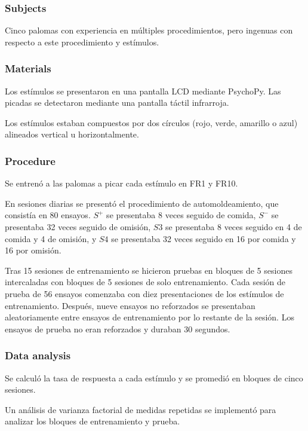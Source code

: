 \documentclass[a4paper,12pt]{article}
\begin{document}
\subsubsection{Subjects}

Cinco palomas con experiencia en múltiples procedimientos, pero ingenuas con respecto a este procedimiento y estímulos.

\subsubsection{Materials}

Los estímulos se presentaron en una pantalla LCD mediante PsychoPy.
Las picadas se detectaron mediante una pantalla táctil infrarroja.

Los estímulos estaban compuestos por dos círculos (rojo, verde, amarillo o azul) alineados vertical u horizontalmente.

\subsubsection{Procedure}

Se entrenó a las palomas a picar cada estímulo en FR1 y FR10.

En sesiones diarias se presentó el procedimiento de automoldeamiento, que consistía en 80 ensayos.
$S^{+}$ se presentaba 8 veces seguido de comida, $S^{-}$ se presentaba 32 veces seguido de omisión, $S3$ se presentaba 8 veces seguido en 4 de comida y 4 de omisión, y $S4$ se presentaba 32 veces seguido en 16 por comida y 16 por omisión.

Tras 15 sesiones de entrenamiento se hicieron pruebas en bloques de 5 sesiones intercaladas con bloques de 5 sesiones de solo entrenamiento.
Cada sesión de prueba de 56 ensayos comenzaba con diez presentaciones de los estímulos de entrenamiento.
Después, nueve ensayos no reforzados se presentaban aleatoriamente entre ensayos de entrenamiento por lo restante de la sesión.
Los ensayos de prueba no eran reforzados y duraban 30 segundos.

\subsubsection{Data analysis}

Se calculó la tasa de respuesta a cada estímulo y se promedió en bloques de cinco sesiones.

Un análisis de varianza factorial de medidas repetidas se implementó para analizar los bloques de entrenamiento y prueba.
\end{document}

